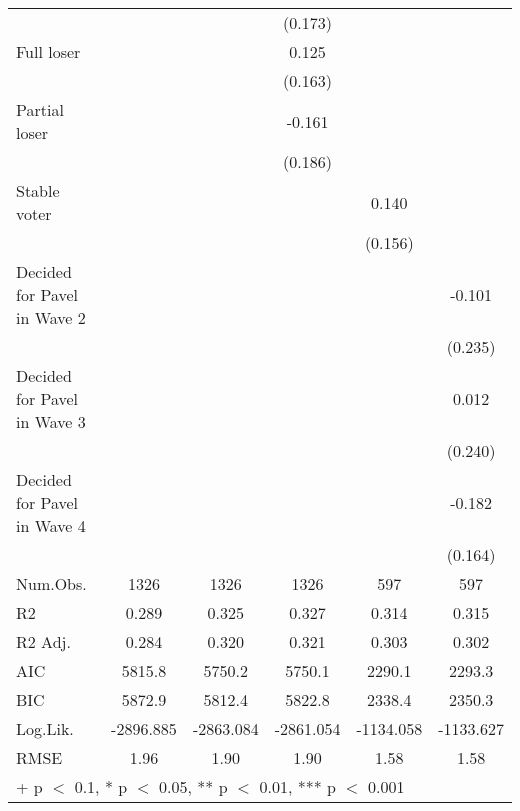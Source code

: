 \begin{table}
\begin{tabular}[t]{lccccc}
 &  &  & (0.173) &  & \\
Full loser &  &  & 0.125 &  & \\
 &  &  & (0.163) &  & \\
Partial loser &  &  & -0.161 &  & \\
 &  &  & (0.186) &  & \\
Stable voter &  &  &  & 0.140 & \\
 &  &  &  & (0.156) & \\
Decided for Pavel in Wave 2 &  &  &  &  & -0.101\\
 &  &  &  &  & (0.235)\\
Decided for Pavel in Wave 3 &  &  &  &  & 0.012\\
 &  &  &  &  & (0.240)\\
Decided for Pavel in Wave 4 &  &  &  &  & -0.182\\
 &  &  &  &  & (0.164)\\
\midrule
Num.Obs. & 1326 & 1326 & 1326 & 597 & 597\\
R2 & 0.289 & 0.325 & 0.327 & 0.314 & 0.315\\
R2 Adj. & 0.284 & 0.320 & 0.321 & 0.303 & 0.302\\
AIC & 5815.8 & 5750.2 & 5750.1 & 2290.1 & 2293.3\\
BIC & 5872.9 & 5812.4 & 5822.8 & 2338.4 & 2350.3\\
Log.Lik. & -2896.885 & -2863.084 & -2861.054 & -1134.058 & -1133.627\\
RMSE & 1.96 & 1.90 & 1.90 & 1.58 & 1.58\\
\bottomrule
\multicolumn{6}{l}{\rule{0pt}{1em}+ p $<$ 0.1, * p $<$ 0.05, ** p $<$ 0.01, *** p $<$ 0.001}\\
\end{tabular}
\end{table}
